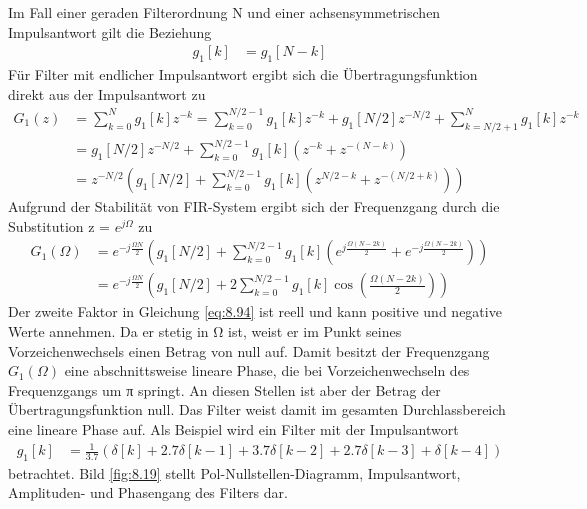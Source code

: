 Im Fall einer geraden Filterordnung N und einer achsensymmetrischen Impulsantwort gilt die Beziehung
\begin{align}
g_{1}[ k] &= g_{1}[ N - k] \label{eq:8.92}
\end{align}
Für Filter mit endlicher Impulsantwort ergibt sich die Übertragungsfunktion direkt aus der Impulsantwort zu
\begin{align}
{G_{1} \left(z\right)} &=  {\sum\limits _{k=0}^{N}g_{1} \left[k\right] z^{-k}  =\sum\limits _{k=0}^{N/2-1}g_{1} \left[k\right] z^{-k}  +g_{1} \left[N/2\right] z^{-N/2} +\sum\limits _{k=N/2+1}^{N}g_{1} \left[k\right] z^{-k}  } \\
{} &=  {g_{1} \left[N/2\right] z^{-N/2} +\sum\limits _{k=0}^{N/2-1}g_{1} \left[k\right] \left(z^{-k} +z^{-\left(N-k\right)} \right) } \\
{} &=  {z^{-N/2}  \left(g_{1} \left[N/2\right]+\sum\limits _{k=0}^{N/2-1}g_{1} \left[k\right] \left(z^{N/2-k} +z^{-\left(N/2+k\right)} \right) \right)}
\label{eq:8.93}
\end{align}
Aufgrund der Stabilität von FIR-System ergibt sich der Frequenzgang durch die Substitution z = \(e^{jΩ}\) zu
\begin{align}
{G_{1} \left(\Omega \right)} &=  {e^{-j \frac{\Omega  N}{2} }  \left(g_{1} \left[N/2\right]+\sum\limits _{k=0}^{N/2-1}g_{1} \left[k\right] \left(e^{j \frac{\Omega  \left(N-2 k\right)}{2} } +e^{-j \frac{\Omega  \left(N-2 k\right)}{2} } \right) \right)} \\
{} &=  {e^{-j \frac{\Omega  N}{2} }  \left(g_{1} \left[N/2\right]+2 \sum\limits _{k=0}^{N/2-1}g_{1} \left[k\right] \cos \left(\frac{\Omega  \left(N-2 k\right)}{2} \right) \right)}
\label{eq:8.94}
\end{align}
Der zweite Faktor in Gleichung \eqref{eq:8.94} ist reell und kann positive und negative Werte annehmen. Da er stetig in Ω ist, weist er im Punkt seines Vorzeichenwechsels einen Betrag von null auf. Damit besitzt der Frequenzgang \(G_{1}(Ω)\) eine abschnittsweise lineare Phase, die bei Vorzeichenwechseln des Frequenzgangs um π springt. An diesen Stellen ist aber der Betrag der Übertragungsfunktion null. Das Filter weist damit im gesamten Durchlassbereich eine lineare Phase auf. Als Beispiel wird ein Filter mit der Impulsantwort
\begin{align}
g_{1}[ k] &= \frac{1}{3.7}  \left( \delta[ k] + 2.7  \delta[ k - 1] + 3.7  \delta[ k - 2] + 2.7  \delta[ k - 3] + \delta[ k - 4] \right) \label{eq:8.95}
\end{align}
betrachtet. Bild \ref{fig:8.19} stellt Pol-Nullstellen-Diagramm, Impulsantwort, Amplituden- und Phasengang des Filters dar.

